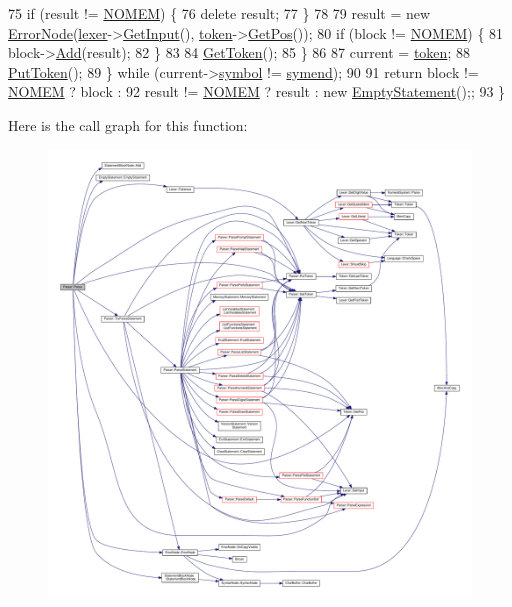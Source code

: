 \begin{DoxyCode}
75             \textcolor{keywordflow}{if} (result != \hyperlink{platform_8h_a46ff2bfbf0d44b8466a2251d5bd5e6f8}{NOMEM}) \{
76                 \textcolor{keyword}{delete} result;
77             \}
78 
79             result = \textcolor{keyword}{new} \hyperlink{classErrorNode}{ErrorNode}(\hyperlink{classParser_a8a8214126b0b0455e3ce375f3e9b20bf}{lexer}->\hyperlink{classLexer_a3032cbeb851294bccd61b722d9a86265}{GetInput}(), 
      \hyperlink{classParser_a467028559d31c5b33f16ca8be56715cc}{token}->\hyperlink{structToken_a5f93ea94940a6eeb060507e1da594599}{GetPos}());
80             \textcolor{keywordflow}{if} (block != \hyperlink{platform_8h_a46ff2bfbf0d44b8466a2251d5bd5e6f8}{NOMEM}) \{
81                 block->\hyperlink{classStatementBlockNode_a7cdae86c013121c1fdab0ee885c2b559}{Add}(result);
82             \}
83 
84             \hyperlink{classParser_a415a103e66558b4d366d9a1420561fe3}{GetToken}();
85         \}
86 
87         current = \hyperlink{classParser_a467028559d31c5b33f16ca8be56715cc}{token};
88         \hyperlink{classParser_adb5c3a188b36f7ecb198ae30f06338b3}{PutToken}();
89     \} \textcolor{keywordflow}{while} (current->\hyperlink{structToken_aa671eaaae5632c5277e89a090d864820}{symbol} != \hyperlink{lex_8h_a7feef761cd73fac6e25b8bb80d2c4e54a9be8426421896b360944c1313abeffdb}{symend});
90 
91     \textcolor{keywordflow}{return} block != \hyperlink{platform_8h_a46ff2bfbf0d44b8466a2251d5bd5e6f8}{NOMEM} ? block :
92            result != \hyperlink{platform_8h_a46ff2bfbf0d44b8466a2251d5bd5e6f8}{NOMEM} ? result : \textcolor{keyword}{new} \hyperlink{classEmptyStatement}{EmptyStatement}();;
93 \}
\end{DoxyCode}


Here is the call graph for this function\+:\nopagebreak
\begin{figure}[H]
\begin{center}
\leavevmode
\includegraphics[width=350pt]{classParser_a1861d1d9cc6165970cf07e07cacd11df_cgraph}
\end{center}
\end{figure}




